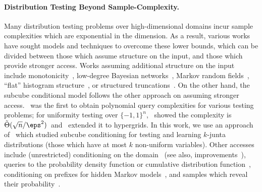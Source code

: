 \paragraph{Distribution Testing Beyond Sample-Complexity.} Many distribution testing problems over high-dimensional domains incur sample complexities which are exponential in the dimension. As a result, various works have sought models and techniques to overcome these lower bounds, which can be divided between those which assume structure on the input, and those which provide stronger access. Works assuming additional structure on the input include monotonicity~\cite{RS09}, low-degree Bayesian networks~\cite{CDKS17, DP17, ABDK18, DKP23}, Markov random fields~\cite{GLP18, DDK19, BBCSV20}, ``flat'' histogram structure~\cite{DKP19}, or structured truncations~\cite{DNS23, DLNS24}. On the other hand, the subcube conditional model follows the other approach on assuming stronger access.~\cite{BC18} was the first to obtain polynomial query complexities for various testing problems; for uniformity testing over $\{-1,1\}^n$,~\cite{CCKLW21} showed the complexity is $\tilde{\Theta}(\sqrt{n}/\eps^2)$~and~\cite{CM24} extended it to hypergrids. In this work, we use an approach of~\cite{CJLW21b} which studied subcube conditioning for testing and learning $k$-junta distributions (those which have at most $k$ non-uniform variables). Other accesses include (unrestricted) conditioning on the domain~\cite{CRS15,CFGM16} (see also, improvements~\cite{FJOPS15, ACK15, KT18, N21, CCK24, CCKM24}),  queries to the probability density function or cumulative distribution function~\cite{BDKR05, CR14}, conditioning on prefixes for hidden Markov models~\cite{MKKZ23}, and samples which reveal their probability~\cite{OS18}. 
